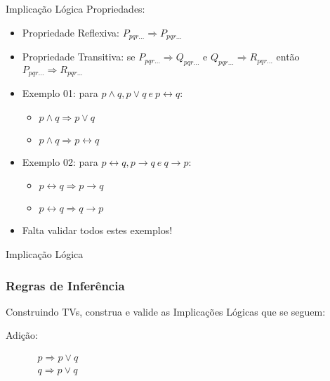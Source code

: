 

\begin{frame}[t]{Implicação Lógica} %
	Propriedades:
	\begin{itemize}
	\item Propriedade Reflexiva: $P_{pqr\ldots} \Rightarrow P_{pqr\ldots}$

	\item Propriedade Transitiva: se $P_{pqr\ldots} \Rightarrow Q_{pqr\ldots}$ e $Q_{pqr\ldots} \Rightarrow R_{pqr\ldots}$ então $P_{pqr\ldots} \Rightarrow R_{pqr\ldots}$

	\item Exemplo 01: para $p \wedge q, p \vee q ~e~ p \leftrightarrow q$:
	\begin{itemize}
	\item $p \wedge q \Rightarrow p \vee q$
	\item $p \wedge q \Rightarrow p \leftrightarrow q$
	\end{itemize}

	\item Exemplo 02: para $p \leftrightarrow q, p \rightarrow q ~e~ q \rightarrow p$:
	\begin{itemize}
	\item $p \leftrightarrow q \Rightarrow p \rightarrow q$
	\item $p \leftrightarrow q \Rightarrow q \rightarrow p$
	\end{itemize}
	
	\item Falta validar todos estes exemplos!
	\end{itemize}
\end{frame}





\begin{frame}[t]{Implicação Lógica} %

\frametitle{Regras de Inferência}

Construindo TVs, construa e valide as Implicações Lógicas que se seguem:

	\begin{description}
	\item[Adição:] 
		$\begin{array}{l}
		   p \Rightarrow p \vee q \\ 
		   q \Rightarrow p \vee q \\
		\end{array}$
	\end{description}
\end{frame}

